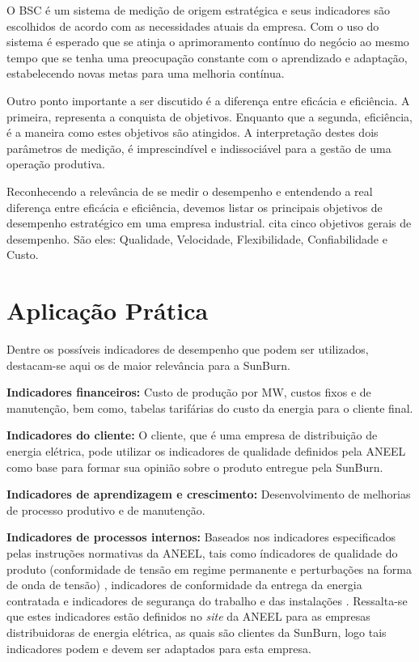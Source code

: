 O BSC é um sistema de medição de origem estratégica e seus indicadores são escolhidos de acordo com as necessidades atuais da empresa. Com o uso do sistema é esperado que se atinja o aprimoramento contínuo do negócio ao mesmo tempo que se tenha uma preocupação constante com o aprendizado e adaptação, estabelecendo novas metas para uma melhoria contínua.

Outro ponto importante a ser discutido é a diferença entre eficácia e eficiência. A primeira, representa a conquista de objetivos. Enquanto que a segunda, eficiência, é a maneira como estes objetivos são atingidos. A interpretação destes dois parâmetros de medição, é imprescindível e indissociável para a gestão de uma operação produtiva.

Reconhecendo a relevância de se medir o desempenho e entendendo a real diferença entre eficácia e eficiência, devemos listar os principais objetivos de desempenho estratégico em uma empresa industrial. %
\cite{slack2006administracao} cita cinco objetivos gerais de desempenho. São eles: Qualidade, Velocidade, Flexibilidade, Confiabilidade e Custo.

\section{Aplicação Prática}
\label{sec:estrategia_da_producao_aplicacao}
Dentre os possíveis indicadores de desempenho que podem ser utilizados, destacam-se aqui os de maior relevância para a SunBurn.

\textbf{Indicadores financeiros:} Custo de produção por MW, custos fixos e de manutenção, bem como, tabelas tarifárias do custo da energia para o cliente final.

\textbf{Indicadores do cliente:} O cliente, que é uma empresa de distribuição de energia elétrica, pode utilizar os indicadores de qualidade definidos pela \ac{ANEEL} como base para formar sua opinião sobre o produto entregue pela SunBurn.

\textbf{Indicadores de aprendizagem e crescimento:} Desenvolvimento de melhorias de processo produtivo e de manutenção.

\textbf{Indicadores de processos internos:} Baseados nos indicadores especificados pelas instruções normativas da \ac{ANEEL}, tais como índicadores de qualidade do produto (conformidade de tensão em regime permanente e perturbações na forma de onda de tensão) \cite{ANEEL_Produto}, indicadores de conformidade da entrega da energia contratada \cite{ANEEL_Continuidade} e indicadores de segurança do trabalho e das instalações \cite{ANEEL_Seguranca}. Ressalta-se que estes indicadores estão definidos no \textit{site} da \ac{ANEEL} para as empresas distribuidoras de energia elétrica, as quais são clientes da SunBurn, logo tais indicadores podem e devem ser adaptados para esta empresa.
